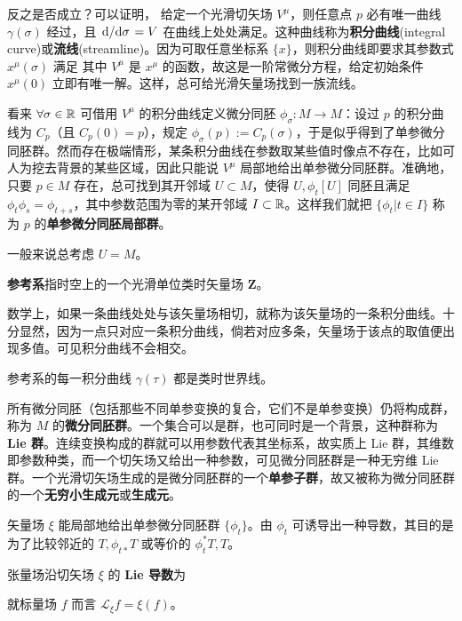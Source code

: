 反之是否成立？可以证明，
给定一个光滑切矢场 $V^\mu$，则任意点 $p$ 必有唯一曲线 $\gamma(\sigma)$ 经过，且 $\dv*{\sigma}=V$ 在曲线上处处满足。这种曲线称为\textbf{积分曲线}(integral curve)或\textbf{流线}(streamline)。因为可取任意坐标系 $\{x\}$，则积分曲线即要求其参数式 $x^\mu(\sigma)$ 满足
其中 $V^\mu$ 是 $x^\mu$ 的函数，故这是一阶常微分方程，给定初始条件 $x^\mu(0)$ 立即有唯一解。这样，总可给光滑矢量场找到一族流线。

看来 $\forall \sigma\in\mathbb{R}$ 可借用 $V^\mu$ 的积分曲线定义微分同胚 $\phi_\sigma:M\to M$：设过 $p$ 的积分曲线为 $C_p$（且 $C_p(0)=p$），规定 $\phi_\sigma(p):=C_p(\sigma)$，于是似乎得到了单参微分同胚群。然而存在极端情形，某条积分曲线在参数取某些值时像点不存在，比如可人为挖去背景的某些区域，因此只能说 $V^\mu$ 局部地给出单参微分同胚群。准确地，只要 $p\in M$ 存在，总可找到其开邻域 $U\subset M$，使得 $U,\phi_t[U]$ 同胚且满足$\phi_t\phi_s=\phi_{t+s}$，其中参数范围为零的某开邻域 $I\subset\mathbb{R}$。这样我们就把 $\{\phi_t|t\in I\}$ 称为 $p$ 的\textbf{单参微分同胚局部群}。

一般来说总考虑 $U=M$。

\textbf{参考系}指时空上的一个光滑单位类时矢量场 $\bm Z$。

数学上，如果一条曲线处处与该矢量场相切，就称为该矢量场的一条积分曲线。十分显然，因为一点只对应一条积分曲线，倘若对应多条，矢量场于该点的取值便出现多值。可见积分曲线不会相交。

参考系的每一积分曲线 $\gamma(\tau)$ 都是类时世界线。

所有微分同胚（包括那些不同单参变换的复合，它们不是单参变换）仍将构成群，称为 $M$ 的\textbf{微分同胚群}。一个集合可以是群，也可同时是一个背景，这种群称为 \textbf{Lie 群}。连续变换构成的群就可以用参数代表其坐标系，故实质上 Lie 群，其维数即参数种类，而一个切矢场又给出一种参数，可见微分同胚群是一种无穷维 Lie 群。一个光滑切矢场生成的是微分同胚群的一个\textbf{单参子群}，故又被称为微分同胚群的一个\textbf{无穷小生成元}或\textbf{生成元}。

矢量场 $\xi$ 能局部地给出单参微分同胚群 $\{\phi_t\}$。由 $\phi_t$ 可诱导出一种导数，其目的是为了比较邻近的 $T,\phi_{t*} T$ 或等价的 $\phi_t^*T,T$。
\begin{definition}
    张量场沿切矢场 $\xi$ 的 \textbf{Lie 导数}为
\end{definition}

\begin{eg}
    就标量场 $f$ 而言 $\mathscr L_\xi f=\xi(f)$。
\end{eg}

